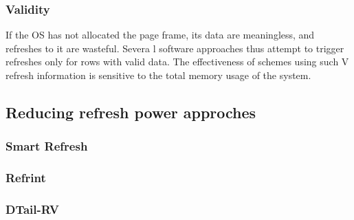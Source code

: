 \subsubsection*{\textbf{Validity}}
If the OS has not allocated the page frame, its data are meaningless, and refreshes to it are wasteful. Severa
l software approaches thus attempt to trigger refreshes only for rows with valid data. The effectiveness of schemes using such V refresh information is sensitive to the total memory usage of the system.

\subsection{Reducing refresh power approches}


\subsubsection*{\textbf{Smart Refresh}}
\label{par:smartrefresh}


\subsubsection*{\textbf{Refrint}}
\label{par:refrint}


\subsubsection*{\textbf{DTail-RV}}
\label{par:dtail}

